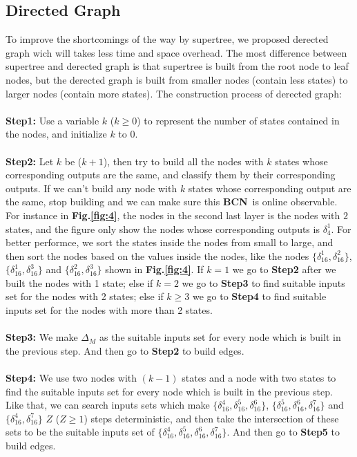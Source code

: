 \documentclass[letterpaper, 10 pt, conference]{ieeeconf}  %
\def \BCN {{\bf BCN}}
\begin{document}
\subsection{Directed Graph}
To improve the shortcomings of the way by supertree, we proposed derected graph wich will takes less time and space overhead. The most difference between supertree and derected graph is that supertree is built from the root node to leaf nodes, but the derected graph is built from smaller nodes (contain less states) to larger nodes (contain more states). The construction process of derected graph:\\
\\
{\bf Step1:} Use a variable $k$ ($k\ge 0$)  to represent the number of states contained in the nodes, and initialize $k$ to $0$.\\
\\
{\bf Step2:} Let $k$ be ($k+1$), then try to build all the nodes with $k$ states whose corresponding outputs are the same, and classify them by their corresponding outputs. If we can't build any node with $k$ states whose corresponding output are the same, stop building and we can make sure this \BCN\ is online observable. For instance in {\bf Fig.\ref{fig:4}}, the nodes in the second last layer is the nodes with $2$ states, and the figure only show the nodes whose corresponding outputs is $\delta_4^1$. For better performce, we sort the states inside the nodes from small to large, and then sort the nodes based on the values inside the nodes, like the nodes $\{\delta_{16}^1,\delta_{16}^2\}$, $\{\delta_{16}^1,\delta_{16}^3\}$ and $\{\delta_{16}^2,\delta_{16}^3\}$ shown in {\bf Fig.\ref{fig:4}}. If $k=1$ we go to {\bf Step2} after we built the nodes with 1 state; else if $k=2$ we go to {\bf Step3} to find suitable inputs set for the nodes with 2 states; else if $k\ge 3$ we go to {\bf Step4} to find suitable inputs set for the nodes with more than 2 states. \\
\\
{\bf Step3:} We make $\Delta_M$ as the suitable inputs set for every node which is built in the previous step. And then go to {\bf Step2} to build edges.\\
\\
{\bf Step4:} We use two nodes with $(k-1)$ states and a node with two states to find the suitable inputs set for every node which is built in the previous step. Like that, we can search inputs sets which make $\{\delta_{16}^4,\delta_{16}^5,\delta_{16}^6\}$, $\{\delta_{16}^5,\delta_{16}^6,\delta_{16}^7\}$ and $\{\delta_{16}^4,\delta_{16}^7\}$ $Z$ ($Z\ge1$) steps deterministic, and then take the intersection of these sets to be the suitable inputs set of $\{\delta_{16}^4,\delta_{16}^5,\delta_{16}^6,\delta_{16}^7\}$. And then go to {\bf Step5} to build edges.\\
\end{document}
